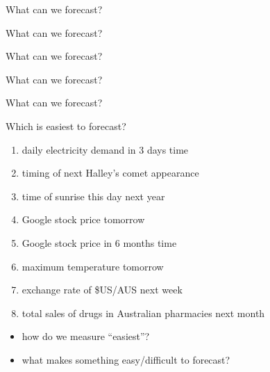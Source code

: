 \documentclass[
  14pt,
  ignorenonframetext,
  aspectratio=169,
]{beamer}
\providecommand{\tightlist}{%
  \setlength{\itemsep}{0pt}\setlength{\parskip}{0pt}}
\begin{document}
\begin{frame}{What can we forecast?}
\protect{}\label{what-can-we-forecast-4}
\end{frame}

\begin{frame}{What can we forecast?}
\protect{}\label{what-can-we-forecast-5}
\end{frame}

\begin{frame}{What can we forecast?}
\protect{}\label{what-can-we-forecast-6}
\end{frame}

\begin{frame}{What can we forecast?}
\protect{}\label{what-can-we-forecast-7}
\end{frame}

\begin{frame}{What can we forecast?}
\protect{}\label{what-can-we-forecast-8}
\end{frame}

\begin{frame}{Which is easiest to forecast?}
\protect{}\label{which-is-easiest-to-forecast}
\begin{enumerate}
\tightlist
\item
  daily electricity demand in 3 days time
\item
  timing of next Halley's comet appearance
\item
  time of sunrise this day next year
\item
  Google stock price tomorrow
\item
  Google stock price in 6 months time
\item
  maximum temperature tomorrow
\item
  exchange rate of \$US/AUS next week
\item
  total sales of drugs in Australian pharmacies next month
\end{enumerate}

\pause

\begin{itemize}
\tightlist
\item
  how do we measure ``easiest''?
\item
  what makes something easy/difficult to forecast?
\end{itemize}
\end{frame}
\end{document}
